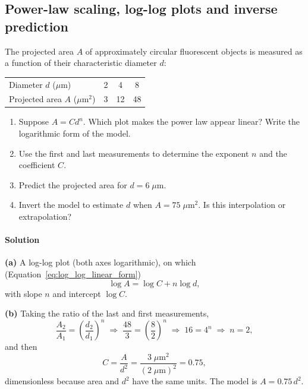 \subsection{Power-law scaling, log-log plots and inverse prediction}
\label{ex:power_law_area}

The projected area $A$ of approximately circular fluorescent objects is measured as a function of their characteristic diameter $d$:
\begin{center}
\begin{tabular}{lccc}
\toprule
Diameter $d$ ($\mu$m) & 2 & 4 & 8 \\
Projected area $A$ ($\mu\text{m}^2$) & 3 & 12 & 48 \\
\bottomrule
\end{tabular}
\end{center}
\begin{enumerate}[label=(\alph*)]
    \item Suppose $A = Cd^n$. Which plot makes the power law appear linear? Write the logarithmic form of the model.
    \item Use the first and last measurements to determine the exponent $n$ and the coefficient $C$.
    \item Predict the projected area for $d = 6\;\mu\text{m}$.
    \item Invert the model to estimate $d$ when $A = 75\;\mu\text{m}^2$. Is this interpolation or extrapolation?
\end{enumerate}

\paragraph{Solution} \textbf{(a)} A log-log plot (both axes logarithmic), on which (Equation~\eqref{eq:log_log_linear_form})
\begin{equation*}
\log A = \log C + n\log d,
\end{equation*}
with slope $n$ and intercept $\log C$.

\textbf{(b)} Taking the ratio of the last and first measurements,
\begin{equation*}
\frac{A_2}{A_1} = \left(\frac{d_2}{d_1}\right)^n \;\Longrightarrow\; \frac{48}{3} = \left(\frac{8}{2}\right)^n \;\Longrightarrow\; 16 = 4^n \;\Longrightarrow\; n = 2,
\end{equation*}
and then
\begin{equation*}
C = \frac{A}{d^2} = \frac{3\;\mu\text{m}^2}{(2\;\mu\text{m})^2} = 0.75,
\end{equation*}
dimensionless because area and $d^2$ have the same units. The model is $A = 0.75\,d^2$.

